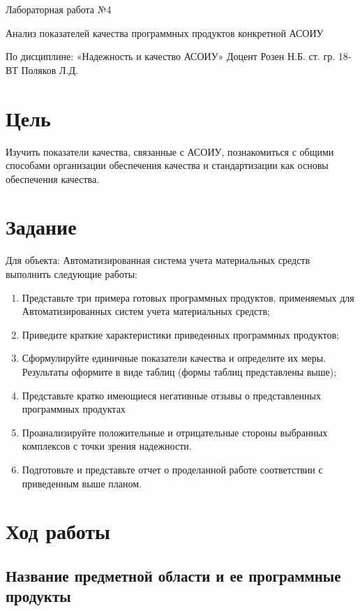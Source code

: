 \documentclass[14pt]{extarticle}
\let\oldsection\section
\renewcommand\section{\clearpage\oldsection}
\begin{document}
\unititle
{\klgtu}
{\fapu}
{\suvt}
{ Лабораторная работа №4 \par Анализ показателей качества программных продуктов конкретной АСОИУ }
{По дисциплине: «Надежность и качество АСОИУ»}
{Доцент}
{Розен Н.Б.}
{ст. гр. 18-ВТ}
{Поляков Л.Д.}

\tableofcontents

\section{Цель}

Изучить показатели качества, связанные с АСОИУ, познакомиться с общими способами организации обеспечения качества и стандартизации как основы обеспечения качества.

\section{Задание}

Для объекта: Автоматизированная система учета материальных средств выполнить следующие работы:
\begin{enumerate}

	\item Представьте три примера готовых программных продуктов, применяемых для Автоматизированных систем учета материальных средств;
	\item Приведите краткие характеристики приведенных программных продуктов;
	\item Сформулируйте единичные показатели качества и определите их меры. Результаты оформите в виде таблиц (формы таблиц представлены выше);
	\item Представьте кратко имеющиеся негативные отзывы о представленных программных продуктах
	\item Проанализируйте положительные и отрицательные стороны выбранных комплексов с точки зрения надежности. 
	\item Подготовьте и представьте отчет о проделанной работе соответствии с приведенным выше планом.
\end{enumerate}

\section{Ход работы}

\subsection{Название предметной области и ее программные продукты}
\end{document}

